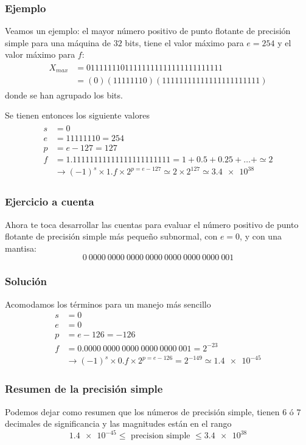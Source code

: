 \begin{frame}
\frametitle{Ejemplo}
Veamos un ejemplo: el mayor número positivo de punto flotante de precisión simple para una máquina de $32$ bits, tiene el valor máximo para $e = 254$ y el valor máximo para $f$:
\fontsize{12}{12}\selectfont
\begin{align}
\begin{aligned}
X_{max} &= 01111 1110 1111 1111 1111 1111 1111 111 \\
&=(0)(1111 1110)(1111 1111 1111 1111 1111 111)
\end{aligned}
\label{eq:ecuacion_01_06}
\end{align}
donde se han agrupado los bits.
\end{frame}
\begin{frame}
Se tienen entonces los siguiente valores
\begin{align}
\begin{aligned}
s &= 0 \\
e &= 1111 1110 = 254 \\
p &= e - 127 = 127 \\
f &= 1.1111 1111 1111 1111 1111 111 = 1 + 0.5 + 0.25 + \ldots + \simeq 2 \\
&\rightarrow (-1)^{s} \times 1.f \times 2^{p=e-127} \simeq 2 \times 2^{127} \simeq \num{3.4e38}
\end{aligned}
\label{eq:ecuacion_01_07}
\end{align}
\end{frame}
 \begin{frame}
 \frametitle{Ejercicio a cuenta}
 Ahora te toca desarrollar las cuentas para evaluar el número positivo de punto flotante de precisión simple más pequeño subnormal, con $e=0$, y con una mantisa:
 \[ 0 \: 0000 \: 0000 \: 0000 \: 0000 \: 0000 \: 0000 \: 0000 \: 001 \]
 \end{frame}
 \begin{frame}
 \frametitle{Solución}
 Acomodamos los términos para un manejo más sencillo
 \begin{align*}
s &= 0 \\
e &= 0 \\
p &= e - 126 = -126 \\
f &= 0.0000 \: 0000 \: 0000 \: 0000 \: 0000 \: 001 = 2^{-23} \\
&\rightarrow (-1)^{s} \times 0.f \times 2^{p=e-126} = 2^{-149} \simeq \num{1.4e-45}
\end{align*}
\end{frame}
\begin{frame}
\frametitle{Resumen de la precisión simple}
Podemos dejar como resumen que los números de precisión simple, tienen $6$ ó $7$ decimales de significancia y las magnitudes están en el rango
\[ \num{1.4e-45} \leq \text{ precision simple } \leq \num{3.4e38} \]
\end{frame}
